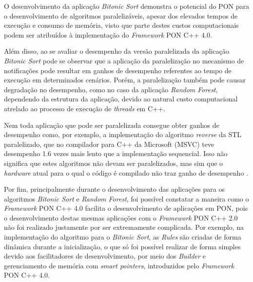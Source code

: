 O desenvolvimento da aplicação \textit{Bitonic Sort} demonstra o potencial do
PON para o desenvolvimento de algoritmos paralelizáveis, apesar dos elevados
tempos de execução e consumo de memória, visto que parte destes custos
computacionais podem ser atribuídos à implementação do \textit{Framework} PON
C++ 4.0.

Além disso, ao se avaliar o desempenho da versão paralelizada da aplicação
\textit{Bitonic Sort} pode se observar que a aplicação da paralelização no
mecanismo de notificações pode resultar em ganhos de desempenho referentes ao
tempo de execução em determinados cenários. Porém, a paralelização também pode
causar degradação no desempenho, como no caso da aplicação \textit{Random
Forest}, dependendo da estrutura da aplicação, devido ao natural custo
computacional atrelado ao processo de execução de \textit{threads} em C++.

Nem toda aplicação que pode ser paralelizada consegue obter ganhos de
desempenho como, por exemplo, a implementação do algoritmo \textit{reverse} da
STL paralelizado, que no compilador para C++ da Microsoft (MSVC) teve desempenho
1.6 vezes mais lento que a implementação sequencial. Isso não significa que
estes algoritmos não devam ser paralelizados, mas sim que o \textit{hardware}
atual para o qual o código é compilado não traz ganho de desempenho
\cite{oneal_2018}.

Por fim, principalmente durante o desenvolvimento das aplicações para os
algoritmos \textit{Bitonic Sort} e \textit{Random Forest}, foi possível
constatar a maneira como o \textit{Framework} PON C++ 4.0 facilita o
desenvolvimento de aplicações em PON, pois o desenvolvimento destas mesmas
aplicações com o \textit{Framework} PON C++ 2.0 não foi realizado justamente por
ser extremamente complicada. Por exemplo, na implementação do algoritmo para o
\textit{Bitonic Sort}, as \textit{Rules} são criadas de forma dinâmica durante a
inicialização, o que só foi possível realizar de forma simples devido aos
facilitadores de desenvolvimento, por meio dos \textit{Builder} e gerenciamento
de memória com \textit{smart pointers}, introduzidos pelo \textit{Framework} PON
C++ 4.0.

